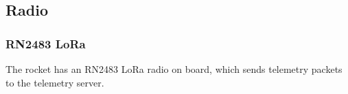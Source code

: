 \subsectionfont{\fontsize{14}{14}\selectfont}

\subsection{Radio}

\subsubsection{RN2483 LoRa}
The rocket has an RN2483 LoRa radio on board, which sends telemetry packets to the telemetry server.
